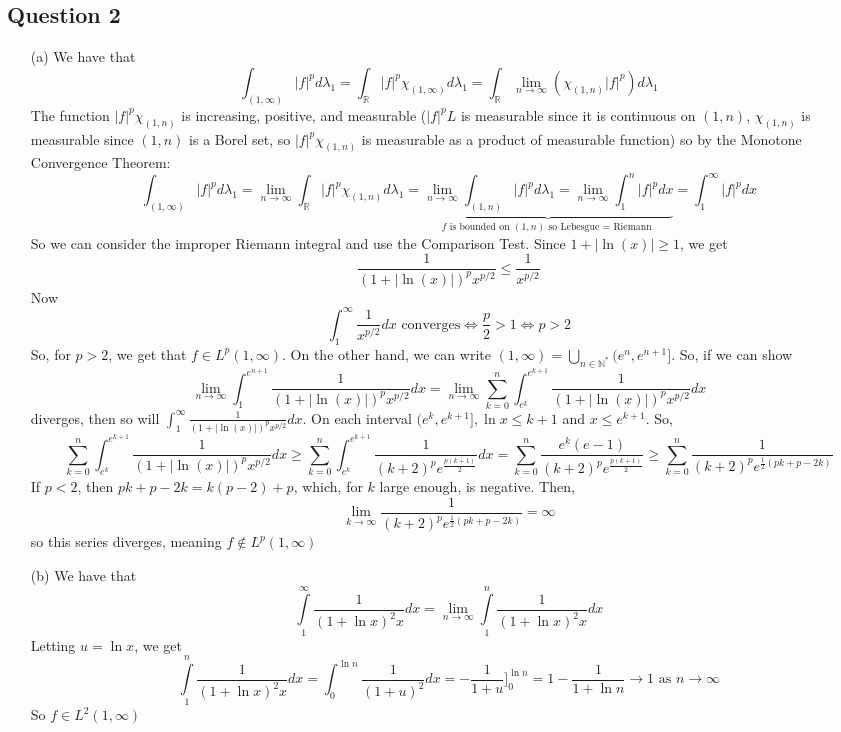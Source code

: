 \documentclass[letterpaper, 11pt]{article}
\newcommand{\1}{\mathds{1}}	%
\theoremstyle{definition}
\begin{document}
\subsection*{Question 2}
\begin{enumerate}
	\item [(a)] We have that \[
	\int _{(1, \infty)} |f|^p d\lambda _1 = \int _{\mathbb{R}} |f|^p \chi _{(1, \infty)} d \lambda _1 = \int _{\mathbb{R}} \lim \limits _{n\to \infty} (\chi _{(1, n)} |f|^p) d \lambda _1
	\]
	The function $|f|^p \chi _{(1, n)}$ is increasing, positive, and measurable ($|f|^pL$ is measurable since it is continuous on $(1, n)$, $\chi _{(1,n)}$ is measurable since $(1,n)$ is a Borel set, so $|f|^p \chi _{(1,n)}$ is measurable as a product of measurable function) so by the Monotone Convergence Theorem:
	\[
	\int _{(1, \infty )} |f|^p d \lambda _1 = \lim \limits _{n \to \infty} \int_{\mathbb{R}} |f|^p \chi _{(1,n)} d\lambda _1 = \underbrace{\lim _{n \to \infty} \int _{(1,n)} |f|^p d \lambda _1 = \lim \limits _{n \to \infty} \int _1^n |f|^p dx}_{f \text{ is bounded on } (1,n) \text{ so Lebesgue = Riemann }} = \int _{1} ^\infty |f|^p dx
	\]
	So we can consider the improper Riemann integral and use the Comparison Test. Since $1+ |\ln (x)| \ge 1$, we get \[\frac{1}{(1+|\ln (x)|)^p x^{p/2}} \le \frac{1}{x^{p/2}}\]Now \[\int _{1}^\infty \frac{1}{x^{p/2}} dx \text{ converges} \iff \frac{p}{2} > 1 \iff p > 2\]
	So, for $p > 2$, we get that $f \in L^p(1, \infty)$. On the other hand, we can write $(1, \infty) = \bigcup \limits _{n \in \mathbb{N}^*} (e^n, e^{n+1}]$. So, if we can show \[
	 \lim \limits _{n \to \infty} \int  _1 ^{e^{n+1}} \frac{1}{(1+|\ln (x)|)^p x^{p/2}} dx= \lim \limits _{n \to \infty} \sum \limits _{k=0}^{n} \int _{e^k}^{e^{k+1}} \frac{1}{(1+|\ln (x)|)^p x^{p/2}}dx
	\]diverges, then so will $\int _1 ^ \infty \frac{1}{(1+|\ln (x)|)^p x^{p/2}} dx$. On each interval $(e^k, e^{k+1}], \ln x \le k+1$ and $x \le e^{k+1}$. So,
	\[
	\sum \limits _{k=0}^{n} \int _{e^k}^{e^{k+1}} \frac{1}{(1+|\ln (x)|)^p x^{p/2}}dx \ge \sum \limits _{k=0}^{n} \int _{e^k}^{e^{k+1}} \frac{1}{(k+2)^p e^{\frac{p(k+1)}{2}}}dx = \sum \limits _{k=0}^{n} \frac{e^k(e-1)}{(k+2)^p e^{\frac{p(k+1)}{2}}} \ge \sum \limits _{k=0}^n \frac{1}{(k+2)^pe^{\frac{1}{2}(pk + p - 2k)}}
		\]
	If $p < 2$, then $pk + p - 2k = k(p - 2) + p$, which, for $k$ large enough, is negative. Then, 
	\[	\lim _{k \to \infty} \frac{1}{(k+2)^pe^{\frac{1}{2}(pk + p - 2k)}} = \infty
	\] so this series diverges, meaning $f \notin L^p (1, \infty)$

	\item [(b)] We have that \[
	\int \limits _{1} ^\infty \frac{1}{(1+\ln x)^2 x} dx  = \lim \limits _{n \to \infty} \int \limits _1 ^n \frac{1}{(1+\ln x)^2 x}dx
	\]
	Letting $u = \ln x$, we get \[
	\int \limits _{1} ^n \frac{1}{(1+\ln x)^2 x} dx  = \int _0 ^{\ln n} \frac{1}{(1+u)^2}dx = - \frac{1}{1+u} \bigg ]_0^ {\ln n} = 1-\frac{1}{1+ \ln n} \to 1 \text{ as } n\to \infty
	\]
	So $f \in L^2(1, \infty)$
	

\end{enumerate}
\end{document}
